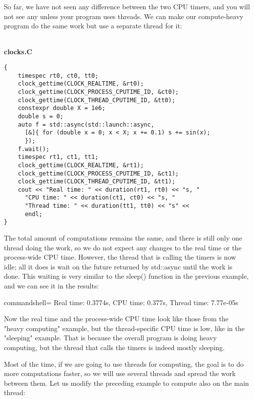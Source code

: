 So far, we have not seen any difference between the two CPU timers, and you will not see any unless your program uses threads. We can make our compute-heavy program do the same work but use a separate thread for it:

\hspace*{\fill} \\ %
\noindent
\textbf{clocks.C}
\begin{lstlisting}[style=styleCXX]
{
	timespec rt0, ct0, tt0;
	clock_gettime(CLOCK_REALTIME, &rt0);
	clock_gettime(CLOCK_PROCESS_CPUTIME_ID, &ct0);
	clock_gettime(CLOCK_THREAD_CPUTIME_ID, &tt0);
	constexpr double X = 1e6;
	double s = 0;
	auto f = std::async(std::launch::async,
	  [&]{ for (double x = 0; x < X; x += 0.1) s += sin(x);
	  });
	f.wait();
	timespec rt1, ct1, tt1;
	clock_gettime(CLOCK_REALTIME, &rt1);
	clock_gettime(CLOCK_PROCESS_CPUTIME_ID, &ct1);
	clock_gettime(CLOCK_THREAD_CPUTIME_ID, &tt1);
	cout << "Real time: " << duration(rt1, rt0) << "s, "
	  "CPU time: " << duration(ct1, ct0) << "s, "
	  "Thread time: " << duration(tt1, tt0) << "s" <<
	  endl;
}
\end{lstlisting}

The total amount of computations remains the same, and there is still only one thread doing the work, so we do not expect any changes to the real time or the process-wide CPU time. However, the thread that is calling the timers is now idle; all it does is wait on the future returned by std::async until the work is done. This waiting is very similar to the sleep() function in the previous example, and we can see it in the results:

\begin{tcblisting}{commandshell={}}
Real time: 0.3774s, CPU time: 0.377s, Thread time: 7.77e-05s
\end{tcblisting}

Now the real time and the process-wide CPU time look like those from the "heavy computing" example, but the thread-specific CPU time is low, like in the "sleeping" example. That is because the overall program is doing heavy computing, but the thread that calls the timers is indeed mostly sleeping.

Most of the time, if we are going to use threads for computing, the goal is to do more computations faster, so we will use several threads and spread the work between them. Let us modify the preceding example to compute also on the main thread:


